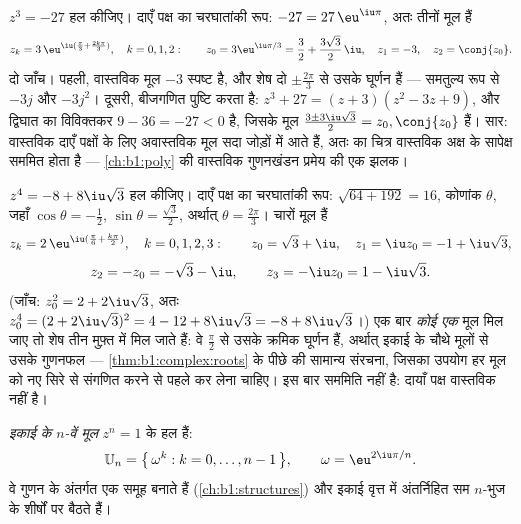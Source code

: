 \begin{example}[$-27$ के घनमूल]\label{ex:b1:complex:cuberoots}
$z^3 = -27$ हल कीजिए। दाएँ पक्ष का चरघातांकी रूप: $-27 = 27\,\eu^{\iu\pi}$,
अतः तीनों मूल हैं
\[
z_k = 3\,\eu^{\iu(\frac\pi3 + \frac{2k\pi}3)}, \quad k = 0, 1, 2 :
\qquad
z_0 = 3\eu^{\iu\pi/3} = \frac32 + \frac{3\sqrt3}2\,\iu,
\quad
z_1 = -3,
\quad
z_2 = \conj{z_0} .
\]
दो जाँच। पहली, वास्तविक मूल $-3$ स्पष्ट है, और शेष दो $\pm\frac{2\pi}3$ से
उसके घूर्णन हैं --- समतुल्य रूप से $-3j$ और $-3j^2$। दूसरी, बीजगणित पुष्टि
करता है: $z^3 + 27 = (z + 3)(z^2 - 3z + 9)$, और द्विघात का विविक्तकर $9 - 36
= -27 < 0$ है, जिसके मूल $\frac{3 \pm 3\iu\sqrt3}2 = z_0, \conj{z_0}$ हैं।
सार: वास्तविक दाएँ पक्षों के लिए अवास्तविक मूल सदा  जोड़ों में आते
हैं, अतः  का चित्र वास्तविक अक्ष के सापेक्ष सममित होता है ---
\cref{ch:b1:poly} की वास्तविक गुणनखंडन प्रमेय की एक झलक।
\end{example}

\begin{example}[अवास्तविक दायाँ पक्ष]\label{ex:b1:complex:fourthroots}
$z^4 = -8 + 8\iu\sqrt3$ हल कीजिए। दाएँ पक्ष का चरघातांकी रूप: 
$\sqrt{64 + 192} = 16$, कोणांक $\theta$, जहाँ $\cos\theta = -\frac12$,
$\sin\theta = \frac{\sqrt3}2$, अर्थात् $\theta = \frac{2\pi}3$। चारों मूल
हैं
\[
z_k = 2\,\eu^{\iu(\frac\pi6 + \frac{k\pi}2)}, \quad k = 0, 1, 2,
3 :
\qquad
z_0 = \sqrt3 + \iu,\quad z_1 = \iu z_0 = -1 + \iu\sqrt3,
\]
\[
z_2 = -z_0 = -\sqrt3 - \iu,\qquad z_3 = -\iu z_0 = 1 - \iu\sqrt3 .
\]
(जाँच: $z_0^2 = 2 + 2\iu\sqrt3$, अतः $z_0^4 = (2 + 2\iu\sqrt3)^2 = 4 - 12 +
8\iu\sqrt3 = -8 + 8\iu\sqrt3$।) एक बार \emph{कोई एक} मूल मिल जाए तो शेष तीन
मुफ़्त में मिल जाते हैं: वे $\frac\pi2$ से उसके क्रमिक घूर्णन हैं, अर्थात्
इकाई के चौथे मूलों से उसके गुणनफल --- \cref{thm:b1:complex:roots} के पीछे की
सामान्य संरचना, जिसका उपयोग हर मूल को नए सिरे से संगणित करने से पहले कर लेना
चाहिए। इस बार  सममिति नहीं है: दायाँ पक्ष वास्तविक नहीं है।
\end{example}

\begin{definition}[इकाई के मूल]\label{def:b1:complex:unity}
\emph{इकाई के $n$-वें मूल} $z^n = 1$ के हल हैं:
\[
\mathbb{U}_n = \bigl\{\, \omega^k : k = 0, \dots, n-1 \,\bigr\},
\qquad \omega = \eu^{2\iu\pi/n}.
\]
वे गुणन के अंतर्गत एक समूह बनाते हैं (\cref{ch:b1:structures}) और इकाई वृत्त
में अंतर्निहित सम $n$-भुज के शीर्षों पर बैठते हैं।
\end{definition}


